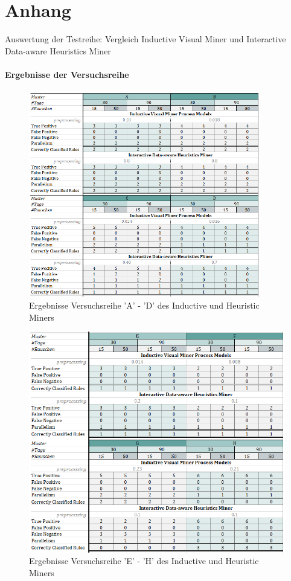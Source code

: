 \chapter*{Anhang} \fancyhead[RE,RO]{}
Auswertung der Testreihe: Vergleich Inductive Visual Miner und Interactive Data-aware Heuristics Miner
\captionsetup[table]{list=no}
\captionsetup[figure]{list=no}
\subsubsection{Ergebnisse der Versuchsreihe}\label{results}
\begin{figure}[!ht]
    \centering
    \includegraphics[width=0.9\textwidth]{figures/Appbildungen/tab1.PNG}
    \caption{Ergebnisse Versuchsreihe 'A' - 'D' des Inductive und Heuristic Miners}
    \label{tab1}
\end{figure}

\begin{figure}[!ht]
    \centering
    \includegraphics[width=\textwidth]{figures/Appbildungen/tab2.PNG}
    \caption{Ergebnisse Versuchsreihe 'E' - 'H' des Inductive und Heuristic Miners}
    \label{tab2}
\end{figure}

